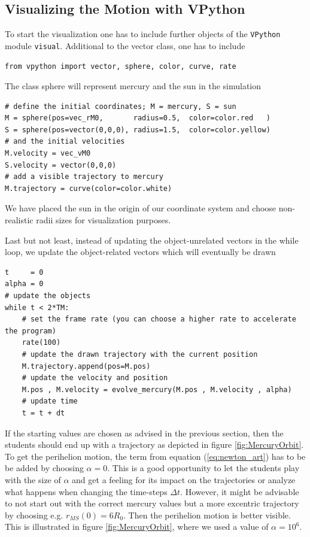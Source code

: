 \documentclass[12pt, UK english]{iopart}
\begin{document}
\subsection{Visualizing the Motion with VPython}
To start the visualization one has to include further objects of the \texttt{VPython} module \texttt{visual}.
Additional to the vector class, one has to include
\begin{lstlisting}
from vpython import vector, sphere, color, curve, rate
\end{lstlisting}
The class sphere will represent mercury and the sun in the simulation
\begin{lstlisting}
# define the initial coordinates; M = mercury, S = sun
M = sphere(pos=vec_rM0,       radius=0.5,  color=color.red   )
S = sphere(pos=vector(0,0,0), radius=1.5,  color=color.yellow)
# and the initial velocities
M.velocity = vec_vM0
S.velocity = vector(0,0,0)
# add a visible trajectory to mercury
M.trajectory = curve(color=color.white)
\end{lstlisting}
We have placed the sun in the origin of our coordinate system and choose non-realistic radii sizes for visualization purposes.

Last but not least, instead of updating the object-unrelated vectors in the while loop, we update the object-related vectors which will eventually be drawn
\begin{lstlisting}
t     = 0
alpha = 0
# update the objects
while t < 2*TM:
	# set the frame rate (you can choose a higher rate to accelerate the program)
	rate(100)
	# update the drawn trajectory with the current position
	M.trajectory.append(pos=M.pos)
	# update the velocity and position
	M.pos , M.velocity = evolve_mercury(M.pos , M.velocity , alpha)
	# update time
	t = t + dt
\end{lstlisting}

If the starting values are chosen as advised in the previous section, then the students should end up with a trajectory as depicted in figure \ref{fig:MercuryOrbit}.
To get the perihelion motion, the term from equation (\ref{eq:newton_art}) has to be be added by choosing $\alpha=0$.
This is a good opportunity to let the students play with the size of $\alpha$ and get a feeling for its impact on the trajectories or analyze what happens when changing the time-steps $\Delta t$.
However, it might be advisable to not start out with the correct mercury values but a more excentric trajectory by choosing e.g. $r_{MS}(0)=6R_0$.
Then the perihelion motion is better visible. This is illustrated in figure \ref{fig:MercuryOrbit}, where we used a value of $\alpha=10^6$.
\end{document}
